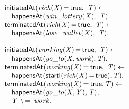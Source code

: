\documentclass[8pt]{beamer}
\DeclareMathOperator{\val}{=}  %
\def \patsize {}
\def\happensAt{\textsf{\patsize happensAt}}
\def\initiatedAt{\textsf{\patsize initiatedAt}}
\def\terminatedAt{\textsf{\patsize terminatedAt}}
\def\startI{\textsf{\patsize startI}}
\def\true{\textsf{\patsize true}}
\newenvironment{mysplit}%
  {\arraycolsep 0pt \begin{array}{l}}%
  {\end{array}}
\begin{document}
\begin{frame}
\begin{minipage}{0.48\linewidth}
        \begin{align*}
            \begin{mysplit}
                \initiatedAt\mathit{(rich(X)\val\true,\ T) \leftarrow}\\
                \quad    \happensAt\mathit{(win\_lottery(X),\ T).}\\
                \terminatedAt\mathit{(rich(X)\val\true,\ T) \leftarrow}\\
                \quad    \happensAt\mathit{(lose\_wallet(X),\ T)}.\\\\
                \initiatedAt\mathit{(working(X)\val\true,\ T)\leftarrow}\\
                \quad    \happensAt\mathit{(go\_to(X,work),T)}.\\
                \terminatedAt\mathit{(working(X)\val\true,\ T) \leftarrow}\\
                \quad    \happensAt\mathit{(\startI(rich(X)\val\true),T)}.\\
                \terminatedAt\mathit{(working(X)\val\true,T)\leftarrow}\\
                \quad    \happensAt\mathit{(go\_to(X,Y),T)},\\
                \quad	 \mathit{Y\ \backslash\val\ work}.\\
            \end{mysplit}
        \end{align*}
    \end{minipage}

\end{frame}
\end{document}
